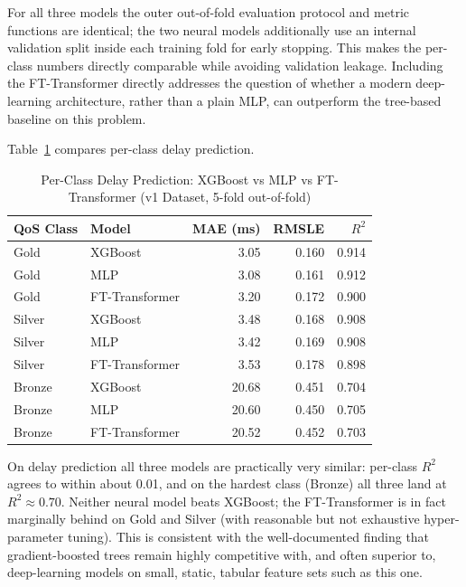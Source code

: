 \documentclass[a4paper,12pt]{Classes/RoboticsLaTeX}
\begin{document}
For all three models the outer out-of-fold evaluation protocol and metric functions are identical; the two neural models additionally use an internal validation split inside each training fold for early stopping. This makes the per-class numbers directly comparable while avoiding validation leakage. Including the FT-Transformer directly addresses the question of whether a modern deep-learning architecture, rather than a plain MLP, can outperform the tree-based baseline on this problem.

Table~\ref{tab:model_compare_delay} compares per-class delay prediction.

\begin{table}[H]
\centering
\caption{Per-Class Delay Prediction: XGBoost vs MLP vs FT-Transformer (v1 Dataset, 5-fold out-of-fold)}
\label{tab:model_compare_delay}
\begin{tabular}{|l|l|r|r|r|}
\hline
\textbf{QoS Class} & \textbf{Model} & \textbf{MAE (ms)} & \textbf{RMSLE} & \textbf{$R^2$} \\
\hline
Gold   & XGBoost        & 3.05 & 0.160 & 0.914 \\
\hline
Gold   & MLP            & 3.08 & 0.161 & 0.912 \\
\hline
Gold   & FT-Transformer & 3.20 & 0.172 & 0.900 \\
\hline
Silver & XGBoost        & 3.48 & 0.168 & 0.908 \\
\hline
Silver & MLP            & 3.42 & 0.169 & 0.908 \\
\hline
Silver & FT-Transformer & 3.53 & 0.178 & 0.898 \\
\hline
Bronze & XGBoost        & 20.68 & 0.451 & 0.704 \\
\hline
Bronze & MLP            & 20.60 & 0.450 & 0.705 \\
\hline
Bronze & FT-Transformer & 20.52 & 0.452 & 0.703 \\
\hline
\end{tabular}
\end{table}

On delay prediction all three models are practically very similar: per-class $R^2$ agrees to within about 0.01, and on the hardest class (Bronze) all three land at $R^2 \approx 0.70$. Neither neural model beats XGBoost; the FT-Transformer is in fact marginally behind on Gold and Silver (with reasonable but not exhaustive hyper-parameter tuning). This is consistent with the well-documented finding that gradient-boosted trees remain highly competitive with, and often superior to, deep-learning models on small, static, tabular feature sets such as this one.
\end{document}
